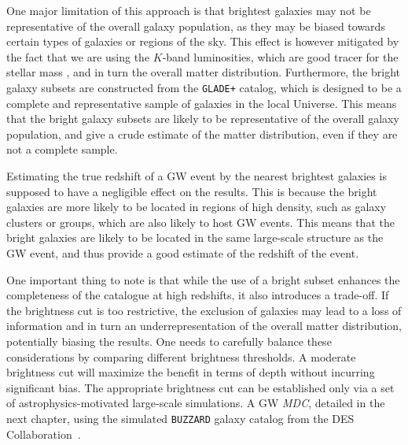 One major limitation of this approach is that brightest galaxies may not be representative of the overall galaxy population, as they may be biased towards certain types of galaxies or regions of the sky. This effect is however mitigated by the fact that we are using the $K$-band luminosities, which are good tracer for the stellar mass \citep{strazzullo2006near,sureshkumar2021galaxy}, and in turn the overall matter distribution. Furthermore, the bright galaxy subsets are constructed from the \texttt{GLADE+} catalog, which is designed to be a complete and representative sample of galaxies in the local Universe. This means that the bright galaxy subsets are likely to be representative of the overall galaxy population, and give a crude estimate of the matter distribution, even if they are not a complete sample.

Estimating the true redshift of a \ac{GW} event by the nearest brightest galaxies is supposed to have a negligible effect on the results. This is because the bright galaxies are more likely to be located in regions of high density, such as galaxy clusters or groups, which are also likely to host \ac{GW} events. This means that the bright galaxies are likely to be located in the same large-scale structure as the \ac{GW} event, and thus provide a good estimate of the redshift of the event. 

One important thing to note is that while the use of a bright subset enhances the completeness of the catalogue at high redshifts, it also introduces a trade-off. If the brightness cut is too restrictive, the exclusion of galaxies may lead to a loss of information and in turn an underrepresentation of the overall matter distribution, potentially biasing the results. One needs to carefully balance these considerations by comparing different brightness thresholds. A moderate brightness cut will maximize the benefit in terms of depth without incurring significant bias. The appropriate brightness cut can be established only via a set of astrophysics-motivated large-scale simulations. A \ac{GW} \textit{\ac{MDC}}, detailed in the next chapter, using the simulated \texttt{BUZZARD} galaxy catalog from the \ac{DES} Collaboration~\citep{DES:2019jmj,DES:2021bwg}.  

